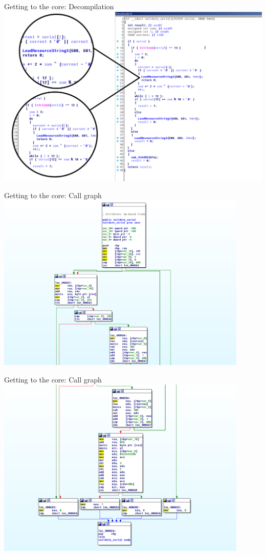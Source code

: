 \documentclass[10pt, compress]{beamer}
\begin{document}
\begin{frame}{Getting to the core: Decompilation}
	\includegraphics[width=\textwidth]{images/sc1-4-validator-rev-zoom.png}
\end{frame}

\begin{frame}{Getting to the core: Call graph}
	\includegraphics[width=0.9\textwidth]{images/sc1-5a-validator-graph.png}
\end{frame}

\begin{frame}{Getting to the core: Call graph}
	\includegraphics[width=0.9\textwidth]{images/sc1-5b-validator-graph.png}
\end{frame}
\end{document}
